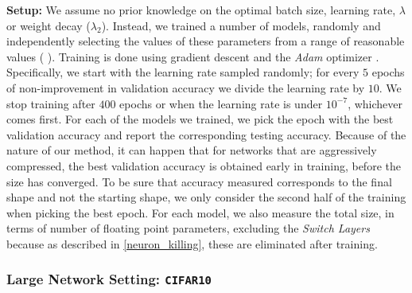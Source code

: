 \noindent\textbf{Setup: }
We assume no prior knowledge on the optimal batch size, learning rate, $\lambda$
or weight decay ($\lambda_2$). Instead, we trained a number of models, randomly
and independently selecting the values of these parameters from a range of
reasonable values ( ).  
Training is done using gradient descent and the \textit{Adam}
optimizer \cite{DBLP:journals/corr/KingmaB14}. Specifically, we start with the
learning rate sampled randomly; for every $5$ epochs of non-improvement in
validation accuracy we divide the learning rate by $10$. We stop training after
$400$ epochs or when the learning rate is under $10^{-7}$, whichever comes
first. For each of the models we trained, we pick the
epoch with the best validation accuracy and report the corresponding testing
accuracy. Because of the nature of our method, it can happen that for networks
that are aggressively compressed, the best validation accuracy is obtained early
in  training, before the size has converged. To be sure that accuracy measured
corresponds to the final shape and not the starting shape, we only consider the
second half of the training when picking the best epoch. For each model, we also
measure the total size, in terms of number of floating point parameters,
excluding the \textit{Switch Layers} because as described in
\cref{neuron_killing}, these are eliminated after training.




\subsubsection{Large Network Setting: \texttt{CIFAR10}}



